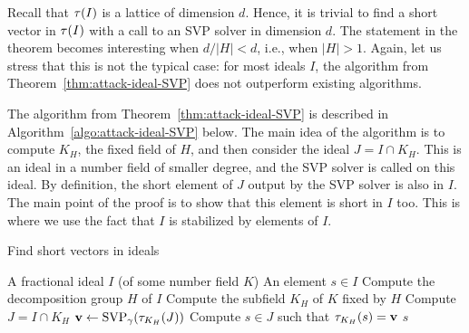 Recall that $\tau(I)$ is a lattice of dimension $d$. Hence, it is trivial to find a short vector in $\tau(I)$ with a call to an SVP solver in dimension $d$. The statement in the theorem becomes interesting when $d/|H| < d$, i.e., when $|H| > 1$. Again, let us stress that this is not the typical case: for most ideals $I$, the algorithm from Theorem~\ref{thm:attack-ideal-SVP} does not outperform existing algorithms.

The algorithm from Theorem~\ref{thm:attack-ideal-SVP} is described in Algorithm~\ref{algo:attack-ideal-SVP} below. The main idea of the algorithm is to compute $K_H$, the fixed field of $H$, and then consider the ideal $J = I \cap K_H$. This is an ideal in a number field of smaller degree, and the SVP solver is called on this ideal. By definition, the short element of $J$ output by the SVP solver is also in $I$. The main point of the proof is to show that this element is short in $I$ too. This is where we use the fact that $I$ is stabilized by elements of $I$.

\begin{algorithm}
\caption{Find short vectors in ideals}
\label{algo:attack-ideal-SVP}
\begin{algorithmic}[1]
\REQUIRE A fractional ideal $I$ (of some number field $K$)
\ENSURE An element $s \in I$
\STATE Compute the decomposition group $H$ of $I$
\STATE Compute the subfield $K_H$ of $K$ fixed by $H$
\STATE Compute $J = I \cap K_H$
\STATE $\mathbf v \leftarrow \text{SVP}_\gamma(\tau_{K_H}(J))$ \label{step:SVP}
\STATE Compute $s \in J$ such that $\tau_{K_H}(s) = \mathbf v$
\RETURN $s$
\end{algorithmic}
\end{algorithm} 

